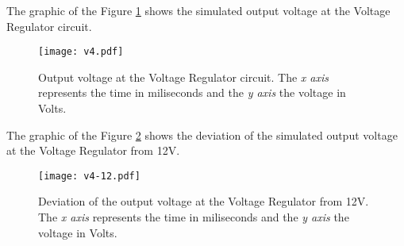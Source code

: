 The graphic of the Figure \ref{fig:sim_regulator} shows the simulated output voltage at the Voltage Regulator circuit.

\begin{figure}[H] \centering
\texttt{[image: v4.pdf]}
\caption{Output voltage at the Voltage Regulator circuit. The \textit{x axis} represents the time in miliseconds and the \textit{y axis} the voltage in Volts.}
\label{fig:sim_regulator}
\end{figure}

The graphic of the Figure \ref{fig:sim_vo-12} shows the deviation of the simulated output voltage at the Voltage Regulator from 12V.

\begin{figure}[H] \centering
\texttt{[image: v4-12.pdf]}
\caption{Deviation of the output voltage at the Voltage Regulator from 12V. The \textit{x axis} represents the time in miliseconds and the \textit{y axis} the voltage in Volts.}
\label{fig:sim_vo-12}
\end{figure}




